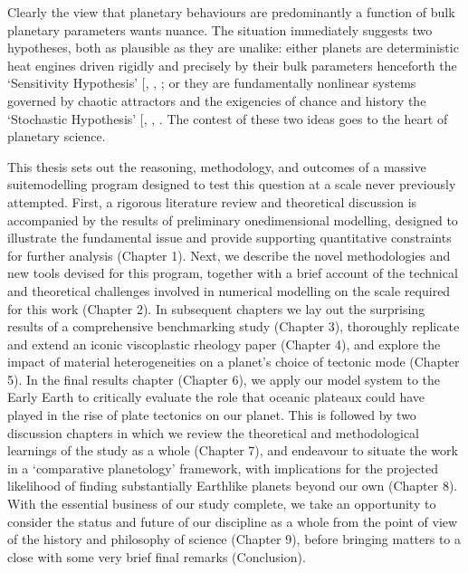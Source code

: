 \documentclass[letterpaper,10pt,english]{jupyterBook}
\begin{document}
\sphinxAtStartPar
Clearly the view that planetary behaviours are predominantly a function of bulk planetary parameters wants nuance. The situation immediately suggests two hypotheses, both as plausible as they are unalike: either planets are deterministic heat engines driven rigidly and precisely by their bulk parameters \sphinxhyphen{} henceforth the ‘Sensitivity Hypothesis’ {[}, , \sphinxcite{references:id744}{]}; or they are fundamentally non\sphinxhyphen{}linear systems governed by chaotic attractors and the exigencies of chance and history \sphinxhyphen{} the ‘Stochastic Hypothesis’ {[}, , \sphinxcite{references:id513}{]}. The contest of these two ideas goes to the heart of planetary science.

\sphinxAtStartPar
This thesis sets out the reasoning, methodology, and outcomes of a massive suite\sphinxhyphen{}modelling program designed to test this question at a scale never previously attempted. First, a rigorous literature review and theoretical discussion is accompanied by the results of preliminary one\sphinxhyphen{}dimensional modelling, designed to illustrate the fundamental issue and provide supporting quantitative constraints for further analysis (Chapter 1). Next, we describe the novel methodologies and new tools devised for this program, together with a brief account of the technical and theoretical challenges involved in numerical modelling on the scale required for this work (Chapter 2). In subsequent chapters we lay out the surprising results of a comprehensive benchmarking study (Chapter 3), thoroughly replicate and extend an iconic viscoplastic rheology paper (Chapter 4), and explore the impact of material heterogeneities on a planet’s choice of tectonic mode (Chapter 5). In the final results chapter (Chapter 6), we apply our model system to the Early Earth to critically evaluate the role that oceanic plateaux could have played in the rise of plate tectonics on our planet. This is followed by two discussion chapters in which we review the theoretical and methodological learnings of the study as a whole (Chapter 7), and endeavour to situate the work in a ‘comparative planetology’ framework, with implications for the projected likelihood of finding substantially Earth\sphinxhyphen{}like planets beyond our own (Chapter 8). With the essential business of our study complete, we take an opportunity to consider the status and future of our discipline as a whole from the point of view of the history and philosophy of science (Chapter 9), before bringing matters to a close with some very brief final remarks (Conclusion).
\end{document}
